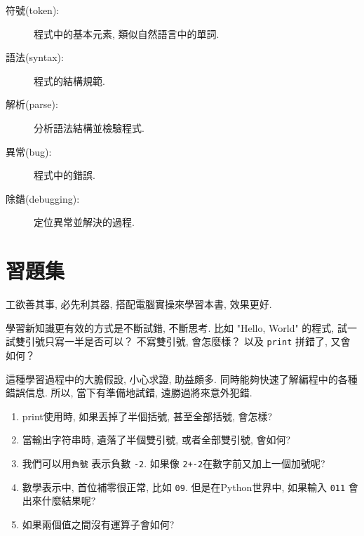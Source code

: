 \documentclass[10pt]{book}
\begin{document}
\begin{description}
\item[符號(token):] 程式中的基本元素, 類似自然語言中的單詞. 

\item[語法(syntax):] 程式的結構規範. 

\item[解析(parse):] 分析語法結構並檢驗程式. 

\item[異常(bug):] 程式中的錯誤. 

\item[除錯(debugging):] 定位異常並解決的過程. 

\end{description}


\section{習題集}

\begin{exercise}

工欲善其事, 必先利其器, 搭配電腦實操來學習本書, 效果更好. 

學習新知識更有效的方式是不斷試錯, 不斷思考. 比如 "Hello, World" 的程式, 
試一試雙引號只寫一半是否可以？
不寫雙引號, 會怎麼樣？
以及 {\tt print} 拼錯了, 又會如何？

這種學習過程中的大膽假設, 小心求證, 助益頗多. 
同時能夠快速了解編程中的各種錯誤信息. 
所以, 當下有準備地試錯, 遠勝過將來意外犯錯. 

\begin{enumerate}

\item print使用時, 如果丟掉了半個括號, 甚至全部括號, 會怎樣?

\item 當輸出字符串時, 遺落了半個雙引號, 或者全部雙引號, 會如何? 

\item 我們可以用{\tt 負號} 表示負數 {\tt -2}. 
如果像 {\tt 2+-2}在數字前又加上一個加號呢? 


\item 數學表示中, 首位補零很正常, 比如 {\tt09}. 
但是在Python世界中, 如果輸入 {\tt 011} 會出來什麼結果呢?

\item 如果兩個值之間沒有運算子會如何? 

\end{enumerate}

\end{exercise}
\end{document}

